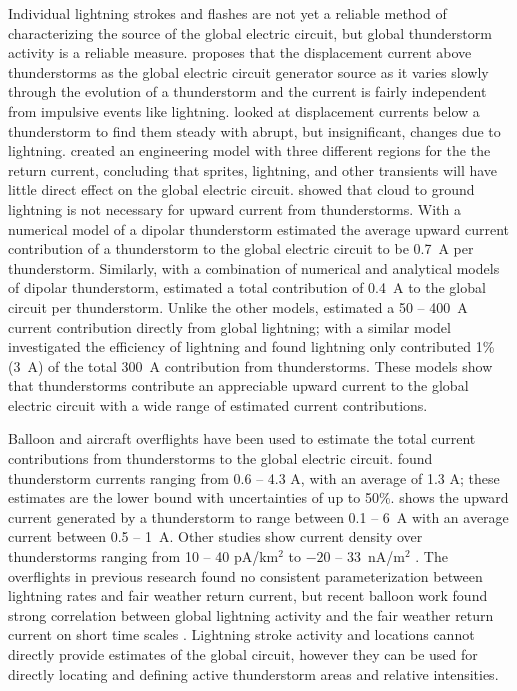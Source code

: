Individual lightning strokes and flashes are not yet a reliable method of characterizing the source of the global electric circuit, but global thunderstorm activity is a reliable measure.
\citet{Ruhnke1969} proposes that the displacement current above thunderstorms as the global electric circuit generator source as it varies slowly through the evolution of a thunderstorm and the current is fairly independent from impulsive events like lightning.
\citet{Krider1985} looked at displacement currents below a thunderstorm to find them steady with abrupt, but insignificant, changes due to lightning.
\citet{Rycroft2000c} created an engineering model with three different regions for the the return current, concluding that sprites, lightning, and other transients will have little direct effect on the global electric circuit.
\citet{Stergis1957} showed that cloud to ground lightning is not necessary for upward current from thunderstorms.
With a numerical model of a dipolar thunderstorm \citet{Tzur1985} estimated the average upward current contribution of a thunderstorm to the global electric circuit to be 0.7~A per thunderstorm.
Similarly, with a combination of numerical and analytical models of dipolar thunderstorm, \citet{Driscoll1992} estimated a total contribution of 0.4~A to the global circuit per thunderstorm.
Unlike the other models, \citet{Mareev2008} estimated a 50 -- 400~A current contribution directly from global lightning;  with a similar model \citet{Mallios2012} investigated the efficiency of lightning and found lightning only contributed 1\% (3~A) of the total 300~A contribution from thunderstorms.
These models show that thunderstorms contribute an appreciable upward current to the global electric circuit with a wide range of estimated current contributions.

Balloon and aircraft overflights have been used to estimate the total current contributions from thunderstorms to the global electric circuit.
\citet{Stergis1957} found thunderstorm currents ranging from 0.6 -- 4.3 A, with an average of 1.3 A; these estimates are the lower bound with uncertainties of up to 50\%.
\citet{Blakeslee1989} shows the upward current generated by a thunderstorm to range between 0.1 -- 6~A with an average current between 0.5 -- 1~A.
Other studies show current density over thunderstorms ranging from 10 -- 40 pA/km$^2$ \citep{Holzworth1981} to $-20$ -- 33~nA/m$^2$ \citep{Mach2009}.
The overflights in previous research found no consistent parameterization between lightning rates and fair weather return current, but recent balloon work found strong correlation between global lightning activity and the fair weather return current on short time scales \citep{Holzworth2005}.
Lightning stroke activity and locations cannot directly provide estimates of the global circuit, however they can be used for directly locating and defining active thunderstorm areas and relative intensities.

